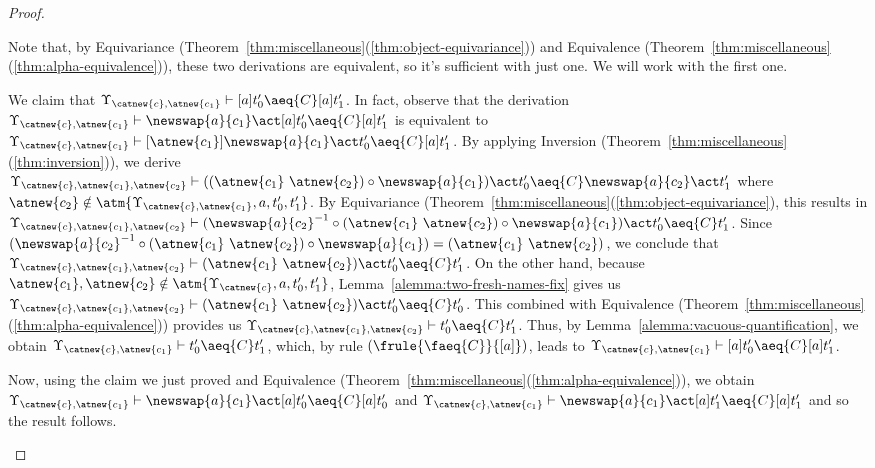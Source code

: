 \begin{proof}
\begin{description}
\begin{enumerate}
\begin{enumerate}
\begin{itemize}
            Note that, by Equivariance (Theorem~\ref{thm:miscellaneous}(\ref{thm:object-equivariance})) and Equivalence (Theorem~\ref{thm:miscellaneous}(\ref{thm:alpha-equivalence})), these two derivations are equivalent, so it's sufficient with just one. We will work with the first one.

            We claim that $\Upsilon_{\catnew{c},\atnew{c_1}} \vdash [a]t_0' \aeq{C} [a]t_1'$. In fact, observe that the derivation $\Upsilon_{\catnew{c},\atnew{c_1}} \vdash \newswap{a}{c_1} \act [a]t_0' \aeq{C} [a]t_1'$ is equivalent to $\Upsilon_{\catnew{c},\atnew{c_1}} \vdash [\atnew{c_1}]\newswap{a}{c_1} \act t_0' \aeq{C} [a]t_1'$. By applying Inversion (Theorem~\ref{thm:miscellaneous}(\ref{thm:inversion})), we derive $\Upsilon_{\catnew{c},\atnew{c_1},\atnew{c_2}} \vdash ((\atnew{c_1} \ \atnew{c_2}) \circ \newswap{a}{c_1}) \act t_0' \aeq{C} \newswap{a}{c_2} \act t_1'$ where $\atnew{c_2}\notin \atm{\Upsilon_{\catnew{c},\atnew{c_1}},a,t_0',t_1'}$. By Equivariance  (Theorem~\ref{thm:miscellaneous}(\ref{thm:object-equivariance}), this results in $\Upsilon_{\catnew{c},\atnew{c_1},\atnew{c_2}} \vdash (\newswap{a}{c_2}^{-1} \circ (\atnew{c_1} \ \atnew{c_2}) \circ \newswap{a}{c_1}) \act t_0' \aeq{C} t_1'$. Since $(\newswap{a}{c_2}^{-1} \circ (\atnew{c_1} \ \atnew{c_2}) \circ \newswap{a}{c_1}) = (\atnew{c_1} \ \atnew{c_2})$, we conclude that $\Upsilon_{\catnew{c},\atnew{c_1},\atnew{c_2}} \vdash (\atnew{c_1} \ \atnew{c_2}) \act t_0' \aeq{C} t_1'$. On the other hand, because $\atnew{c_1},\atnew{c_2}\notin \atm{\Upsilon_{\catnew{c}},a,t_0',t_1'}$, Lemma~\ref{alemma:two-fresh-names-fix} gives us $\Upsilon_{\catnew{c},\atnew{c_1},\atnew{c_2}} \vdash (\atnew{c_1} \ \atnew{c_2})\act t_0' \aeq{C} t_0'$. This combined with Equivalence (Theorem~\ref{thm:miscellaneous}(\ref{thm:alpha-equivalence})) provides us $\Upsilon_{\catnew{c},\atnew{c_1},\atnew{c_2}} \vdash t_0' \aeq{C} t_1'$. Thus, by Lemma~\ref{alemma:vacuous-quantification}, we obtain $\Upsilon_{\catnew{c},\atnew{c_1}} \vdash  t_0' \aeq{C} t_1'$, which, by rule $(\frule{\faeq{C}}{[a]})$, leads to $\Upsilon_{\catnew{c},\atnew{c_1}} \vdash [a]t_0' \aeq{C} [a]t_1'$.

            Now, using the claim we just proved and Equivalence (Theorem~\ref{thm:miscellaneous}(\ref{thm:alpha-equivalence})), we obtain $\Upsilon_{\catnew{c},\atnew{c_1}} \vdash \newswap{a}{c_1}\act [a]t_0'\aeq{C} [a]t_0'$ and $\Upsilon_{\catnew{c},\atnew{c_1}} \vdash \newswap{a}{c_1}\act [a]t_1'\aeq{C} [a]t_1'$ and so the result follows.
            \end{itemize}


\end{enumerate}
\end{enumerate}
\end{description}
\end{proof}

